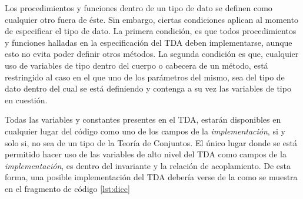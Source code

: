 Los procedimientos y funciones dentro de un tipo de dato se definen como
cualquier otro fuera de éste. Sin embargo, ciertas condiciones aplican al
momento de especificar el tipo de dato. La primera condición, es que todos
procedimientos y funciones halladas en la especificación del TDA deben
implementarse, aunque esto no evita poder definir otros métodos. La segunda
condición es que, cualquier uso de variables de tipo dentro del cuerpo o
cabecera de un método, está restringido al caso en el que uno de los
parámetros del mismo, sea del tipo de dato dentro del cual se está definiendo
y contenga a su vez las variables de tipo en cuestión.

Todas las variables y constantes presentes en el TDA, estarán disponibles en
cualquier lugar del código como uno de los campos de la
\textit{implementación}, si y solo si, no sea de un tipo de la Teoría de
Conjuntos. El único lugar donde se está permitido hacer uso de las variables
de alto nivel del TDA como campos de la \textit{implementación}, es dentro del
invariante y la relación de acoplamiento. De esta forma, una posible
implementación del TDA  debería verse de la como se muestra
en el fragmento de código \ref{lst:dicc}


